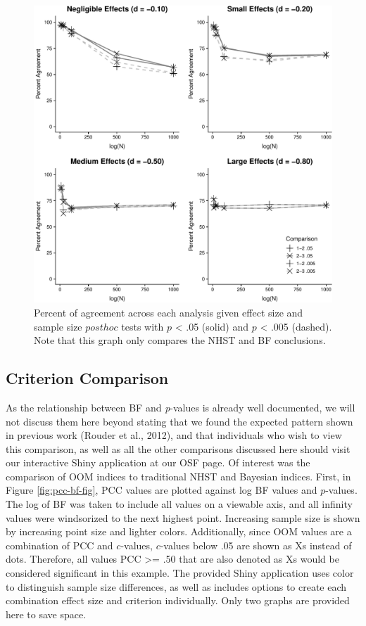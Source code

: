 \documentclass[english,mask,man]{apa6}
\theoremstyle{definition}
\theoremstyle{definition}
\theoremstyle{definition}
\theoremstyle{remark}
\begin{document}
\begin{figure}
\centering
\includegraphics{alt_nhst_FINAL_files/figure-latex/agree-graph-post-1.pdf}
\caption{\label{fig:agree-graph-post}Percent of agreement across each
analysis given effect size and sample size \(post hoc\) tests with \(p\)
\textless{} .05 (solid) and \(p\) \textless{} .005 (dashed). Note that
this graph only compares the NHST and BF conclusions.}
\end{figure}

\subsection{Criterion Comparison}\label{criterion-comparison}

As the relationship between BF and \emph{p}-values is already well
documented, we will not discuss them here beyond stating that we found
the expected pattern shown in previous work (Rouder et al., 2012), and
that individuals who wish to view this comparison, as well as all the
other comparisons discussed here should visit our interactive Shiny
application at our OSF page. Of interest was the comparison of OOM
indices to traditional NHST and Bayesian indices. First, in Figure
\ref{fig:pcc-bf-fig}, PCC values are plotted against log BF values and
\(p\)-values. The log of BF was taken to include all values on a
viewable axis, and all infinity values were windsorized to the next
highest point. Increasing sample size is shown by increasing point size
and lighter colors. Additionally, since OOM values are a combination of
PCC and \(c\)-values, \(c\)-values below .05 are shown as Xs instead of
dots. Therefore, all values PCC \textgreater{}= .50 that are also
denoted as Xs would be considered significant in this example. The
provided Shiny application uses color to distinguish sample size
differences, as well as includes options to create each combination
effect size and criterion individually. Only two graphs are provided
here to save space.
\end{document}
